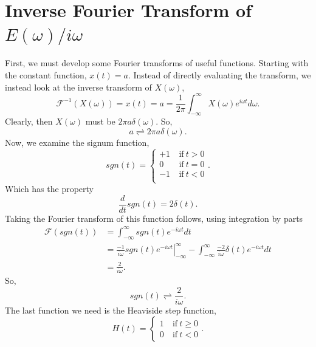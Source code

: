 \documentclass[12pt,twocolumn]{article}
\begin{document}


\newpage
\onecolumn
\appendix
\section{Inverse Fourier Transform of $E(\omega)/i\omega$}
\label{ap:fourier1}

First, we must develop some Fourier transforms of useful functions. Starting with the constant function, $x(t)=a$. Instead of directly evaluating the transform, we instead look at the inverse transform of $X(\omega)$,
\begin{equation*}
\mathcal{F}^{-1}(X(\omega))=x(t)=a=\frac{1}{2\pi}\int_{-\infty}^{\infty}X(\omega)e^{i\omega t}d\omega.
\end{equation*}
Clearly, then $X(\omega)$ must be $2\pi a\delta(\omega)$. So,
\begin{equation}
a\rightleftharpoons 2\pi a\delta(\omega).
\end{equation}
Now, we examine the signum function,
\begin{equation}
\mathit{sgn}(t) =
    \begin{cases}
    +1~&\mathrm{if}~t>0 \\
    0~&\mathrm{if}~t=0  \\
    -1~&\mathrm{if}~t<0 \\
    \end{cases}.
\end{equation}
Which has the property
\begin{equation}
\frac{d}{dt}\mathit{sgn}(t) = 2\delta(t).
\end{equation}
Taking the Fourier transform of this function follows, using integration by parts
\begin{equation*}
\begin{aligned}
\mathcal{F}(\mathit{sgn}(t))&= \int_{-\infty}^{\infty}\mathit{sgn}(t)e^{-i\omega t}dt \\
&= \left.\frac{-1}{i\omega}\mathit{sgn}(t)e^{-i\omega t}\right|_{-\infty}^{\infty} - \int_{-\infty}^{\infty}\frac{-2}{i\omega}\delta(t)e^{-i\omega t}dt \\
&= \frac{2}{i\omega}.
\end{aligned}
\end{equation*}
So,
\begin{equation}
\mathit{sgn}(t)\rightleftharpoons\frac{2}{i\omega}.
\end{equation}
The last function we need is the Heaviside step function,
\begin{equation}
H(t) =
    \begin{cases}
    1~&\mathrm{if}~t\geq0 \\
    0~&\mathrm{if}~t<0
    \end{cases}.
\end{equation}
\end{document}
